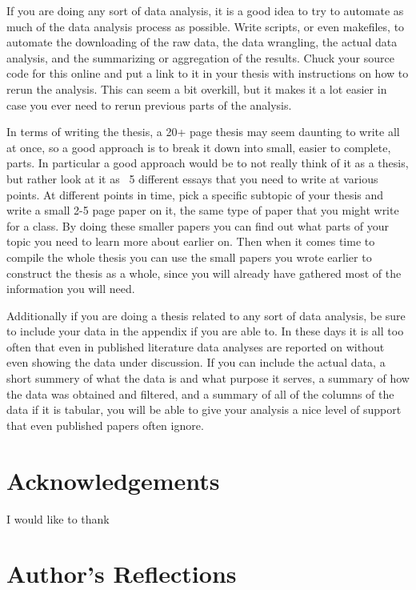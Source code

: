 \documentclass[]{article}
\begin{document}
If you are doing any sort of data analysis, it is a good idea to try to automate as much of the data analysis process as possible. Write scripts, or even makefiles, to automate the downloading of the raw data, the data wrangling, the actual data analysis, and the summarizing or aggregation of the results. Chuck your source code for this online and put a link to it in your thesis with instructions on how to rerun the analysis. This can seem a bit overkill, but it makes it a lot easier in case you ever need to rerun previous parts of the analysis.

In terms of writing the thesis, a 20+ page thesis may seem daunting to write all at once, so a good approach is to break it down into small, easier to complete, parts. In particular a good approach would be to not really think of it as a thesis, but rather look at it as ~5 different essays that you need to write at various points. At different points in time, pick a specific subtopic of your thesis and write a small 2-5 page paper on it, the same type of paper that you might write for a class. By doing these smaller  papers you can find out what parts of your topic you need to learn more about earlier on. Then when it comes time to compile the whole thesis you can use the small papers you wrote earlier to construct the thesis as a whole, since you will already have gathered most of the information you will need.

Additionally if you are doing a thesis related to any sort of data analysis, be sure to include your data in the appendix if you are able to. In these days it is all too often that even in published literature data analyses are reported on without even showing the data under discussion. If you can include the actual data, a short summery of what the data is and what purpose it serves, a summary of how the data was obtained and filtered, and a summary of all of the columns of the data if it is tabular, you will be able to give your analysis a nice level of support that even published papers often ignore.

\newpage

\section{Acknowledgements}

I would like to thank

\newpage

\section{Author's Reflections}
\end{document}
